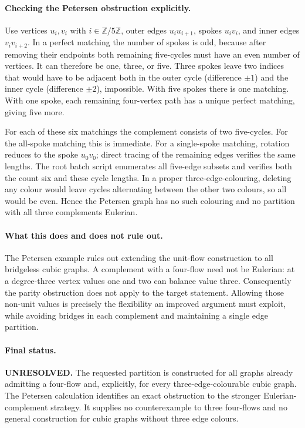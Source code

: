 \documentclass[11pt,a4paper]{article}
\begin{document}
\paragraph{Checking the Petersen obstruction explicitly.}
Use vertices $u_i,v_i$ with $i\in\mathbb Z/5\mathbb Z$, outer edges
$u_iu_{i+1}$, spokes $u_iv_i$, and inner edges $v_iv_{i+2}$.
In a perfect matching the number of spokes is odd, because after removing
their endpoints both remaining five-cycles must have an even number of
vertices. It can therefore be one, three, or five. Three spokes leave
two indices that would have to be adjacent both in the outer cycle
(difference $\pm1$) and the inner cycle (difference $\pm2$), impossible.
With five spokes there is one matching. With one spoke, each remaining
four-vertex path has a unique perfect matching, giving five more.

For each of these six matchings the complement consists of two five-cycles.
For the all-spoke matching this is immediate. For a single-spoke matching,
rotation reduces to the spoke $u_0v_0$; direct tracing of the remaining
edges verifies the same lengths. The root batch script enumerates all
five-edge subsets and verifies both the count six and these cycle lengths.
In a proper three-edge-colouring, deleting any colour would leave cycles
alternating between the other two colours, so all would be even. Hence
the Petersen graph has no such colouring and no partition with all three
complements Eulerian.

\paragraph{What this does and does not rule out.}
The Petersen example rules out extending the unit-flow construction to
all bridgeless cubic graphs. A complement with a four-flow need not be
Eulerian: at a degree-three vertex values one and two can balance value
three. Consequently the parity obstruction does not apply to the target
statement. Allowing those non-unit values is precisely the flexibility
an improved argument must exploit, while avoiding bridges in each
complement and maintaining a single edge partition.

\paragraph{Final status.}
\textbf{UNRESOLVED.} The requested partition is constructed for all
graphs already admitting a four-flow and, explicitly, for every
three-edge-colourable cubic graph. The Petersen calculation identifies
an exact obstruction to the stronger Eulerian-complement strategy.
It supplies no counterexample to three four-flows and no general
construction for cubic graphs without three edge colours.
\end{document}
